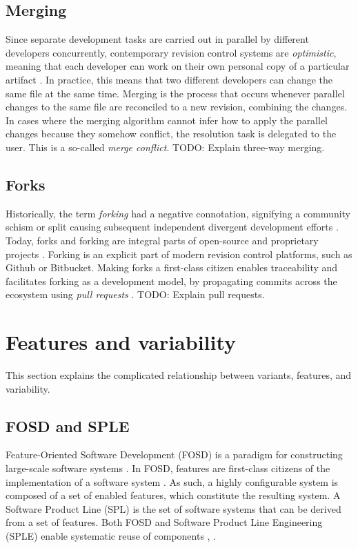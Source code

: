 \subsection{Merging}
Since separate development tasks are carried out in parallel by different developers concurrently, contemporary revision control systems are \textit{optimistic}, meaning that each developer can work on their own personal copy of a particular artifact \cite{mens2002}. In practice, this means that two different developers can change the same file at the same time. Merging is the process that occurs whenever parallel changes to the same file are reconciled to a new revision, combining the changes. In cases where the merging algorithm cannot infer how to apply the parallel changes because they somehow conflict, the resolution task is delegated to the user. This is a so-called \textit{merge conflict}. TODO: Explain three-way merging.

\subsection{Forks}
Historically, the term \textit{forking} had a negative connotation, signifying a community schism or split causing subsequent independent divergent development efforts \cite{stanciulescu2015}. Today, forks and forking are integral parts of open-source and proprietary projects \cite{stanciulescu2015}. %
Forking is an explicit part of modern revision control platforms, such as Github or Bitbucket. Making forks a first-class citizen enables traceability and facilitates forking as a development model, by propagating commits across the ecosystem using \textit{pull requests} \cite{stanciulescu2015}. TODO: Explain pull requests.

\section{Features and variability}
This section explains the complicated relationship between variants, features, and variability.

\subsection{FOSD and SPLE}
Feature-Oriented Software Development (FOSD) is a paradigm for constructing large-scale software systems \cite{apel2009overview}. In FOSD, features are first-class citizens of the implementation of a software system \cite{apel2009overview}. As such, a highly configurable system is composed of a set of enabled features, which constitute the resulting system. A Software Product Line (SPL) is the set of software systems that can be derived from a set of features. Both FOSD and Software Product Line Engineering (SPLE) enable systematic reuse of components \cite{apel2009overview}, \cite{antkiewicz2014flexible}.

